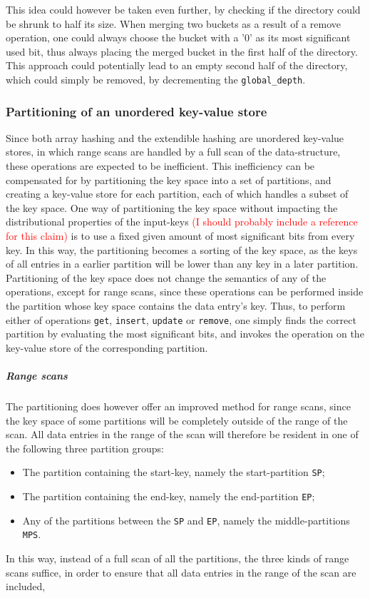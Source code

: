 \documentclass[11pt]{article} %
\begin{document}
This idea could however be taken even further, by checking if the directory could be shrunk to half its size. When merging two buckets as a result of a remove operation, one could always choose the bucket with a '0' as its most significant used bit, thus always placing the merged bucket in the first half of the directory. This approach could potentially lead to an empty second half of the directory, which could simply be removed, by decrementing the \verb|global_depth|. 

\subsubsection{Partitioning of an unordered key-value store}
Since both array hashing and the extendible hashing are unordered key-value stores, in which range scans are handled by a full scan of the data-structure, these operations are expected to be inefficient. This inefficiency can be compensated for by partitioning the key space into a set of partitions, and creating a key-value store for each partition, each of which handles a subset of the key space. One way of partitioning the key space without impacting the distributional properties of the input-keys \textcolor{red}{(I should probably include a reference for this claim)} is to use a fixed given amount of most significant bits from every key. In this way, the partitioning becomes a sorting of the key space, as the keys of all entries in a earlier partition will be lower than any key in a later partition. \\

Partitioning of the key space does not change the semantics of any of the operations, except for range scans, since these operations can be performed inside the partition whose key space contains the data entry's key. Thus, to perform either of operations \verb|get|, \verb|insert|, \verb|update| or \verb|remove|, one simply finds the correct partition by evaluating the most significant bits, and invokes the operation on the key-value store of the corresponding partition.\

\subparagraph{Range scans} The partitioning does however offer an improved method for range scans, since the key space of some partitions will be completely outside of the range of the scan. All data entries in the range of the scan will therefore be resident in one of the following three partition groups:
\begin{itemize}
  \item The partition containing the start-key, namely the start-partition \verb|SP|;
  \item The partition containing the end-key, namely the end-partition \verb|EP|;
  \item Any of the partitions between the \verb|SP| and \verb|EP|, namely the middle-partitions \verb|MPS|.
\end{itemize}
In this way, instead of a full scan of all the partitions, the three kinds of range scans suffice, in order to ensure that all data entries in the range of the scan are included,
\\
\end{document}

